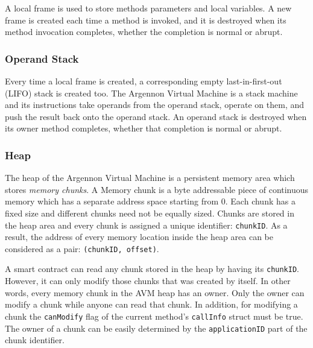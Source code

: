A local frame is used to store methods parameters and local variables. A new frame is created each time a method
is invoked, and it is destroyed when its method invocation completes, whether the completion is normal or abrupt.

\subsubsection{Operand Stack}

Every time a local frame is created, a corresponding empty last-in-first-out (LIFO) stack is created too. The
Argennon Virtual Machine is a stack machine and its instructions take operands from the operand stack, operate on
them, and push the result back onto the operand stack. An operand stack is destroyed when its owner method
completes, whether that completion is normal or abrupt.

\subsubsection{Heap}

The heap of the Argennon Virtual Machine is a persistent memory area which stores \emph{memory chunks}. A Memory
chunk is a byte addressable piece of continuous memory which has a separate address space starting from 0. Each chunk
has a fixed size and different chunks need not be equally sized. Chunks are stored in the heap area and every chunk is
assigned a unique identifier: \texttt{chunkID}. As a result, the address of every memory location inside
the heap area can be considered as a pair: \texttt{(chunkID, offset)}.

A smart contract can read any chunk stored in the heap by having its \texttt{chunkID}. However, it can only modify
those chunks that was created by itself. In other words, every memory chunk in the AVM heap has an owner. Only
the owner can modify a chunk while anyone can read that chunk. In addition, for modifying a chunk the \texttt{canModify}
flag of the current method's \texttt{callInfo} struct must be true. The owner of a chunk can be easily determined
by the \texttt{applicationID} part of the chunk identifier.


